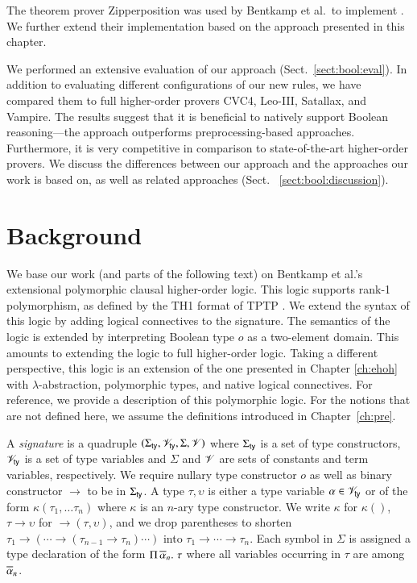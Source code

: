 The theorem prover Zipperposition \cite{sc-15-simon-phd,sc-supind-17} was used
by Bentkamp et al.\ to implement \lsup{}. We further extend their implementation
based on the approach presented in this chapter.

We performed an extensive evaluation of our approach (Sect.~\ref{sect:bool:eval}).
In addition to evaluating different configurations of our new rules, we have
compared them to full higher-order provers CVC4, Leo-III,  Satallax, and Vampire.
The results suggest that it is beneficial to natively support Boolean reasoning---the approach outperforms preprocessing-based approaches. Furthermore, it is
very competitive in comparison to state-of-the-art higher-order provers. We discuss the differences between our approach and the
approaches our work is based on, as well as related approaches (Sect.~
\ref{sect:bool:discussion}).


\section{Background} 
\label{sect:bool:background}

We base our work (and parts of the following text) on Bentkamp et al.'s
\cite{bbtvw-21-sup-lam} extensional polymorphic clausal higher-order logic. This
logic supports rank-1 polymorphism, as defined by the TH1 format of TPTP
\cite{ksr-16-th1}.
We
extend the syntax of this logic by adding logical connectives to the signature.
The semantics of the logic is extended by interpreting Boolean type $o$ as a
two-element domain. This amounts to extending the logic to full higher-order
logic. Taking a different perspective, this logic is an extension of the one
presented in Chapter \ref{ch:ehoh} with $\lambda$-abstraction, polymorphic
types, and native logical connectives. For reference, we provide a
description of this polymorphic logic. For the notions that are not defined here,
we assume the definitions introduced in Chapter~\ref{ch:pre}.

A {\em signature} is a quadruple $(\Sigma_\mathsf{ty}, \mathscr{V}_\mathsf{ty}, \Sigma, \mathscr{V})$ where $\Sigma_\mathsf{ty}$ is a
set of type constructors, $\mathscr{V}_\mathsf{ty}$ is a set of type variables and $\Sigma$ and
$\mathscr{V}$ are sets of constants and term variables, respectively. We require nullary
type constructor $o$ as well as binary constructor $\rightarrow$
to be in $\Sigma_\mathsf{ty}$. A type $\tau, \upsilon$ is either a type variable $\alpha \in
\mathscr{V}_\mathsf{ty}$ or of the form $\kappa(\tau_1, \ldots \tau_n)$ where $\kappa$ is an
$n$-ary type constructor. We write $\kappa$ for $\kappa()$, $\tau \rightarrow
\upsilon$ for $\rightarrow(\tau, \upsilon)$, and we drop parentheses to shorten 
$\tau_1 \rightarrow (\cdots \rightarrow (\tau_{n-1} \rightarrow \tau_n) \cdots)$ into $\tau_1 \rightarrow \cdots \rightarrow
\tau_n$. Each symbol in $\Sigma$ is
assigned a type declaration of the form $\Pi\,\overline{\alpha}_{n}.\; \tau$ where all variables
occurring in $\tau$ are among $\overline{\alpha}_{n}$.


